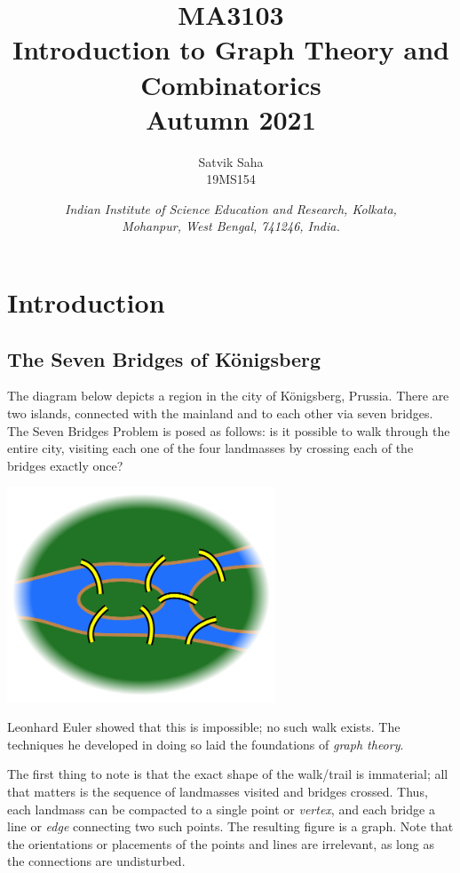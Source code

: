 \documentclass[11pt]{article}
\title{
    \Large\textsc{MA3103} \\
    \Huge \textbf{Introduction to Graph Theory and Combinatorics} \\
    \vspace{5pt}
    \Large{Autumn 2021}
}
\author{
    \large Satvik Saha
    \\\textsc{\small 19MS154}
}
\date{\normalsize
    \textit{Indian Institute of Science Education and Research, Kolkata, \\
    Mohanpur, West Bengal, 741246, India.} \\
}
\theoremstyle{definition}
\theoremstyle{remark}
\numberwithin{equation}{section}
\begin{document}
    \maketitle

    \tableofcontents

    \section{Introduction}
    
    \subsection{The Seven Bridges of K\"onigsberg}
    
    The diagram below depicts a region in the city of K\"onigsberg, Prussia. There
    are two islands, connected with the mainland and to each other via seven bridges.
    The Seven Bridges Problem is posed as follows: is it possible to walk through the
    entire city, visiting each one of the four landmasses by crossing each of the
    bridges exactly once?

    \begin{center}
        \includegraphics[width=0.6\textwidth]{7_bridges.png}
    \end{center}

    Leonhard Euler showed that this is impossible; no such walk exists. The
    techniques he developed in doing so laid the foundations of \textit{graph
    theory}.

    The first thing to note is that the exact shape of the walk/trail is immaterial;
    all that matters is the sequence of landmasses visited and bridges crossed. Thus,
    each landmass can be compacted to a single point or \textit{vertex}, and each
    bridge a line or \textit{edge} connecting two such points. The resulting figure
    is a graph. Note that the orientations or placements of the points and lines are
    irrelevant, as long as the connections are undisturbed.
\end{document}
